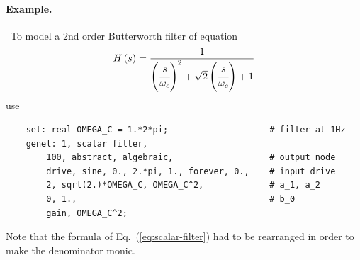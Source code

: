 \paragraph{Example.} \
To model a 2nd order Butterworth filter of equation
\begin{equation}
	H\left( s \right) = \frac{
		1
	}{
		\left( \cfrac{s}{\omega_c} \right)^2
		+ \sqrt{2}\left( \cfrac{s}{\omega_c} \right)
		+ 1
	}
	\label{eq:scalar-filter}
\end{equation}
use
\begin{verbatim}
    set: real OMEGA_C = 1.*2*pi;                    # filter at 1Hz
    genel: 1, scalar filter,
        100, abstract, algebraic,                   # output node
        drive, sine, 0., 2.*pi, 1., forever, 0.,    # input drive
        2, sqrt(2.)*OMEGA_C, OMEGA_C^2,             # a_1, a_2
        0, 1.,                                      # b_0
        gain, OMEGA_C^2;
\end{verbatim}
Note that the formula of Eq.~(\ref{eq:scalar-filter})
had to be rearranged in order to make the denominator monic.




